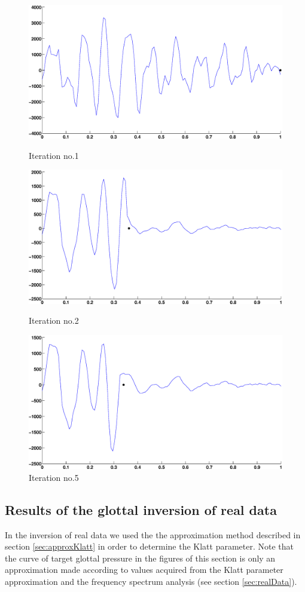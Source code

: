 \documentclass[12pt,a4]{article}
\begin{document}
\begin{figure}[H]
\begin{center}
 \includegraphics[scale=.35]{img/Approx_iter_onePer-v3-1.eps}
 \caption{Iteration no.1}
 \includegraphics[scale=.35]{img/Approx_iter_onePer-v3-2.eps}
 \caption{Iteration no.2}
 \includegraphics[scale=.35]{img/Approx_iter_onePer-v3-3.eps}
 \caption{Iteration no.5}\label{fig:app3-end}
\end{center}
\end{figure}

\subsection{Results of the glottal inversion of real data}
\label{sec:realResults}
In the inversion of real data we used the the approximation method described in section \ref{sec:approxKlatt} in order to determine the Klatt parameter. Note that the curve of target glottal pressure in the figures of this section is only an approximation made according to values acquired from the Klatt parameter approximation and the frequency spectrum analysis (see section \ref{sec:realData}).
\end{document}

